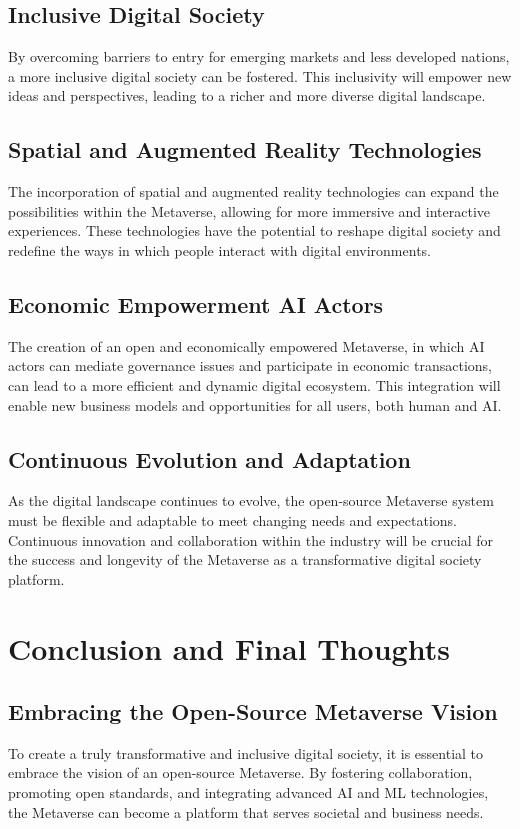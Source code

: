 \subsection{Inclusive Digital Society}
By overcoming barriers to entry for emerging markets and less developed nations, a more inclusive digital society can be fostered. This inclusivity will empower new ideas and perspectives, leading to a richer and more diverse digital landscape.

\subsection{Spatial and Augmented Reality Technologies}
The incorporation of spatial and augmented reality technologies can expand the possibilities within the Metaverse, allowing for more immersive and interactive experiences. These technologies have the potential to reshape digital society and redefine the ways in which people interact with digital environments.

\subsection{Economic Empowerment AI Actors}
The creation of an open and economically empowered Metaverse, in which AI actors can mediate governance issues and participate in economic transactions, can lead to a more efficient and dynamic digital ecosystem. This integration will enable new business models and opportunities for all users, both human and AI.

\subsection{Continuous Evolution and Adaptation}
As the digital landscape continues to evolve, the open-source Metaverse system must be flexible and adaptable to meet changing needs and expectations. Continuous innovation and collaboration within the industry will be crucial for the success and longevity of the Metaverse as a transformative digital society platform.

\section{Conclusion and Final Thoughts}
\subsection{Embracing the Open-Source Metaverse Vision}
To create a truly transformative and inclusive digital society, it is essential to embrace the vision of an open-source Metaverse. By fostering collaboration, promoting open standards, and integrating advanced AI and ML technologies, the Metaverse can become a platform that serves societal and business needs.

